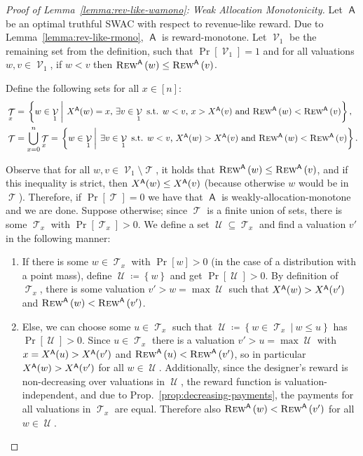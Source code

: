 \documentclass[11pt,letterpaper]{article}
\newcommand{\set}[1]{\left\{#1\right\}}
\newcommand{\sqbr}[1]{\left[ #1 \right]}
\newcommand{\wamono}{weakly-allocation-monotone\xspace}
\newcommand{\rmono}{reward-monotone\xspace}
\newcommand{\swac}{SWAC\xspace}
\newcommand \sett[2] { \left.\left\{{#1}\medspace\right\vert\medspace{#2}\right\}}
\newcommand{\sqrrange}[1]{[#1]}
\DeclareMathOperator{\A}{\auc{A}}
\DeclareMathOperator{\T}{\mathcal{T}}
\DeclareMathOperator{\U}{\mathcal{U}}
\DeclareMathOperator{\V}{\mathcal{V}}
\theoremstyle{plain}
\newcommand{\auc}[1]{\mathsf{#1}}
\begin{document}
\begin{proof}[Proof of Lemma~\ref{lemma:rev-like-wamono}: Weak Allocation Monotonicity]
    Let $\A$ be an optimal truthful \swac with respect to revenue-like reward. Due to  Lemma~\ref{lemma:rev-like-rmono}, $\A$ is \rmono. Let $\V_1$ be the remaining set from the definition, such that $\Pr\sqbr{\V_1}=1$ and for all valuations $w,v\in\V_1$, if $w<v$ then $\trew[\A]{w}\leq \trew[\A]{v}$. 
    
    Define the following sets for all $x\in\sqrrange{n}$:    
    \begin{align*}
        &\T_x=\sett{w\in\V_1}{\x[\A]{w}=x\textnormal{, }\exists v\in\V_1\textnormal{ s.t. } w<v\textnormal{, }x>\x[\A]{v}\textnormal{ and }\trew[\A]{w}<\trew[\A]{v}},\\
        &\T=\bigcup_{x=0}^n \T_x=\sett{w\in\V_1}{\exists v\in\V_1\textnormal{ s.t. }w<v\textnormal{, }\x[\A]{w}>\x[\A]{v}\textnormal{ and }\trew[\A]{w}<\trew[\A]{v}}.
    \end{align*}

    Observe that for all $w,v\in\V_1\setminus\T$, it holds that $\trew[\A]{w}\leq \trew[\A]{v}$, and if this inequality is strict, then $\x[\A]{w}\leq\x[\A]{v}$ (because otherwise $w$ would be in $\T$). Therefore, if $\Pr[\T]=0$ we have that $\A$ is \wamono and we are done.
    Suppose otherwise; since $\T$ is a finite union of sets, there is some $\T_x$ with $\Pr[\T_x]>0$. We define a set $\U\subseteq\T_x$ and find a valuation $v'$ in the following manner:
    \begin{enumerate}
        \item If there is some $w\in\T_x$ with $\Pr[w]>0$ (in the case of a distribution with a point mass), define $\U\coloneq \set{w}$ and get $\Pr[\U]>0$. By definition of $\T_x$, there is some valuation $v'>w=\max\U$ such that $\x[\A]{w}>\x[\A]{v'}$ and $\trew[\A]{w}<\trew[\A]{v'}$.
        \item Else, we can choose some $u\in\T_x$ such that $\U\coloneq\sett{w\in\T_x}{w\leq u}$ has $\Pr[\U]>0$. Since $u\in\T_x$ there is a valuation $v'>u=\max\U$ with $x=\x[\A]{u}>\x[\A]{v'}$ and $\trew[\A]{u}<\trew[\A]{v'}$, so in particular $\x[\A]{w}>\x[\A]{v'}$ for all $w\in\U$. Additionally, since the designer's reward is non-decreasing over valuations in $\U$, the reward function is valuation-independent, and 
        due to Prop.~\ref{prop:decreasing-payments}, the payments for all valuations in $\T_x$ are equal. Therefore also $\trew[\A]{w}<\trew[\A]{v'}$ for all $w\in\U$.
    \end{enumerate}
    

\end{proof}
\end{document}
